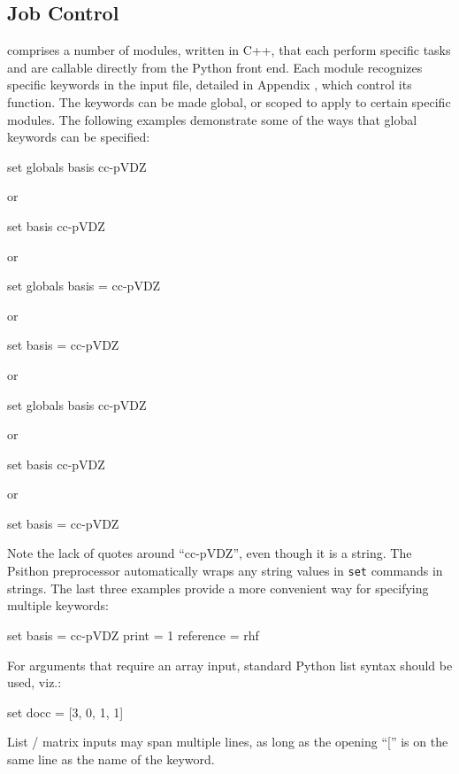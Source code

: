 \subsection{Job Control}
\PSIfour comprises a number of modules, written in C++, that each perform
specific tasks and are callable directly from the Python front end. Each module
recognizes specific keywords in the input file, detailed in Appendix \label{keywords}, which
control its function. The keywords can be made global, or scoped to apply to
certain specific modules. The following examples demonstrate some of the ways
that global keywords can be specified:
\begin{Snippet}
set globals basis cc-pVDZ

 or

set basis cc-pVDZ

 or

set globals basis = cc-pVDZ

 or

set basis = cc-pVDZ

 or

set globals{
  basis cc-pVDZ
}

 or

set{
  basis cc-pVDZ
}

 or

set{
  basis = cc-pVDZ
}
\end{Snippet}
Note the lack of quotes around ``cc-pVDZ'', even though it is a string. The
Psithon preprocessor automatically wraps any string values in {\tt set} commands in
strings. The last three examples provide a more convenient way for specifying
multiple keywords:
\begin{Snippet}
set{
  basis = cc-pVDZ
  print = 1
  reference = rhf
}
\end{Snippet}
For arguments that require an array input, standard Python list syntax should
be used, viz.:
\begin{Snippet}
set{
  docc = [3, 0, 1, 1]
}
\end{Snippet}
List / matrix inputs may span multiple lines, as long as the opening ``['' is
on the same line as the name of the keyword.


